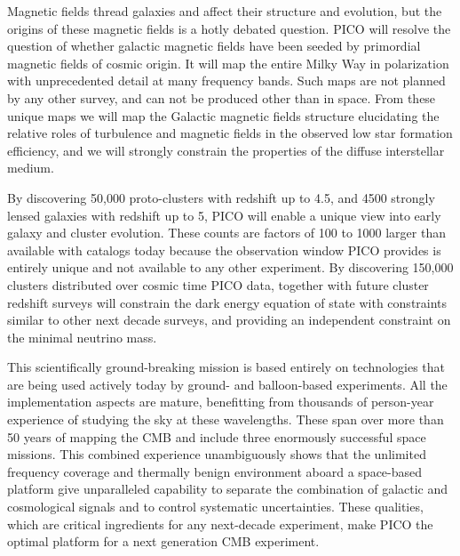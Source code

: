 \documentclass[PICOReport.tex]{subfiles}
\begin{document}
Magnetic fields thread galaxies and affect their structure and evolution, but the origins of these magnetic fields is a hotly debated question. PICO will resolve the question of whether galactic magnetic fields have been seeded by primordial magnetic fields of cosmic origin. It will map the entire Milky Way in polarization with unprecedented detail at many frequency bands. Such maps are not planned by any other survey, and can not be produced other than in space. From these unique maps we will map the Galactic magnetic fields structure elucidating the relative roles of turbulence and magnetic fields in the observed low star formation efficiency, and we will strongly constrain the properties of the diffuse interstellar medium. 

By discovering 50,000 proto-clusters with redshift up to 4.5, and  4500 strongly lensed galaxies with redshift up to 5, PICO will enable a unique view into early galaxy and cluster evolution. These counts are factors of 100 to 1000 larger than available with catalogs today because the observation window PICO provides is entirely unique and not available to any other experiment. By discovering 150,000 clusters distributed over cosmic time PICO data, together with future cluster redshift surveys will constrain the dark energy equation of state with constraints similar to other next decade surveys, and providing an independent constraint on the minimal neutrino mass. 

This scientifically ground-breaking mission is based entirely on technologies that are being used actively today by ground- and balloon-based experiments. All the implementation aspects are mature, benefitting from thousands of person-year experience of studying the sky at these wavelengths. These span over more than 50 years of mapping the CMB and include three enormously successful space missions. This combined experience unambiguously shows that the unlimited frequency coverage and thermally benign environment aboard a space-based platform give unparalleled capability to separate the combination of galactic and cosmological signals and to control systematic uncertainties. These qualities, which are critical ingredients for any next-decade experiment, make PICO the optimal platform for a next generation CMB experiment. 






\end{document}
